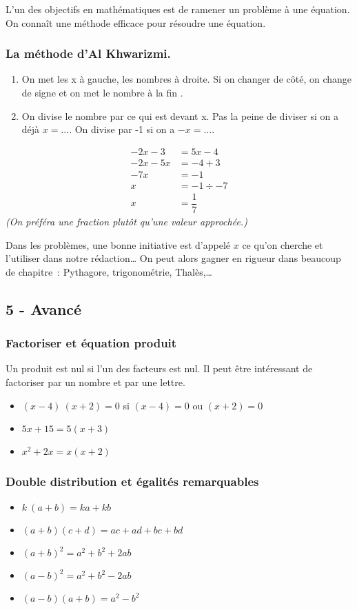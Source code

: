 \documentclass[11pt]{article}
\begin{document}
L’un des objectifs en mathématiques est de ramener un problème à une équation. On connaît une méthode efficace pour résoudre une équation.
\begin{multicols}{2}
  \subsubsection*{La méthode d’Al Khwarizmi.}
  \begin{enumerate}
  \item On met les x à gauche, les nombres à droite. Si on changer de côté, on change de signe et on met le nombre \fg à la fin \og.
  \item On divise le nombre par ce qui est devant x. Pas la peine de diviser si on a déjà $x= ...$. On divise par -1 si on a $-x = ...$.
  \end{enumerate}

  \begin{align*}
    -2x - 3 &= 5x - 4 \\
    -2x -5x &= -4 + 3 \\
    -7x &= -1  \\
    x &= -1 \div -7 \\
    x &= \dfrac{1}{7}
  \end{align*}
  \textit{(On préféra une fraction plutôt qu'une valeur approchée.)}
\end{multicols}

Dans les problèmes, une bonne initiative est d’appelé $x$ ce qu’on cherche et l’utiliser dans notre rédaction… On peut alors gagner en rigueur dans beaucoup de chapitre : Pythagore, trigonométrie, Thalès,…

\subsection*{5 - Avancé}

\subsubsection*{Factoriser et équation produit}

Un produit est nul si l’un des facteurs est nul. Il peut être intéressant de factoriser par un nombre et par une lettre.

\begin{itemize}
\item $(x-4) ~ (x + 2) = 0 $ si  $(x-4) = 0 $ ou $(x + 2) = 0 $
\item $5x + 15 = 5(x + 3)$
\item $x^2 + 2x = x(x + 2)$ 
\end{itemize} 

\subsubsection*{Double distribution et égalités remarquables}

\begin{itemize}
\item $k ~ (a + b) = ka + kb$
\item $(a + b)(c + d) = ac + ad + bc + bd$
\item $(a + b)^2 = a^2 + b^2 + 2 ab$
\item $(a - b)^2 = a^2 + b^2 - 2 ab$
\item $(a - b)(a + b) = a^2 - b^2$
\end{itemize} 
\end{document}
